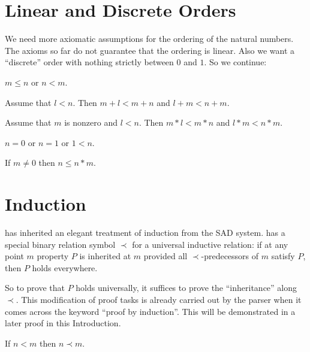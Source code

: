\documentclass[11pt]{article}
\begin{document}
\section{Linear and Discrete Orders}

We need more axiomatic assumptions for the ordering of the natural numbers. The axioms
so far do not guarantee that the ordering is linear. Also we want
a ``discrete'' order with nothing strictly between
$0$ and $1$. So we continue:

\begin{forthel}

\begin{axiom} $m \leq n$ or $n < m$.
\end{axiom}

\begin{lemma} Assume that $l < n$.
  Then $m + l < m + n$ and $l + m < n + m$.
\end{lemma}

\begin{lemma} Assume that $m$ is nonzero and $l < n$.
  Then $m * l < m * n$ and $l * m < n * m$.
\end{lemma}

\begin{axiom} $n = 0$ or $n = 1$ or $1 < n$.
\end{axiom}

\begin{lemma} If $m \neq 0$ then $n \leq n * m$.
\end{lemma}
\end{forthel}

\section{Induction}

\Naproche has inherited an elegant treatment of induction
from the SAD system. \Naproche has a special binary relation
symbol $\prec$ for a universal inductive relation: if at any
point $m$ property $P$ is inherited at $m$ provided all
$\prec$-predecessors of $m$ satisfy $P$, then $P$ holds everywhere.

So to prove that $P$ holds universally, it suffices to prove
the ``inheritance'' along $\prec$. This modification of proof tasks
is already carried out by the parser when it comes across the
keyword ``proof by induction''. This will be demonstrated in a
later proof in this Introduction.

\begin{forthel}
\begin{axiom} If $n < m$ then $n \prec m$.
\end{axiom}
\end{forthel}
\end{document}
